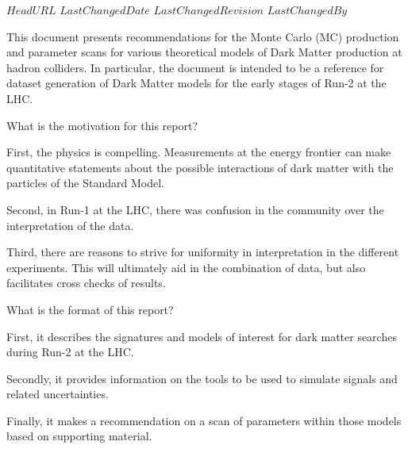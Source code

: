 \svnidlong
{$HeadURL$}
{$LastChangedDate$}
{$LastChangedRevision$}
{$LastChangedBy$}
\pagestyle{fancy}
\fancyhead{}
\fancyhead[ol]{\svnrev;\svndate;\svnauthor}

This document presents recommendations for
the Monte Carlo (MC) production and parameter scans
for various theoretical models of Dark Matter production
at hadron colliders.  In particular, the document is
intended to be a reference for dataset generation of
Dark Matter models for the early stages of Run-2 at the LHC.

What is the motivation for this report?

First, the physics is compelling. Measurements at the energy frontier
can make quantitative statements about the possible interactions of
dark matter with the particles of the Standard Model.

Second, in Run-1 at the LHC, there was confusion in the community
over the interpretation of the data.

Third, there are reasons to strive for uniformity in interpretation
in the different experiments.  This will ultimately aid in the
combination of data, but also facilitates cross checks of results.

What is the format of this report?

First, it describes the signatures and models of interest for
dark matter searches during Run-2 at the LHC.

Secondly, it provides information on the tools to be used to
simulate signals and related uncertainties.

Finally, it makes a recommendation on a scan of parameters within
those models based on supporting material.

